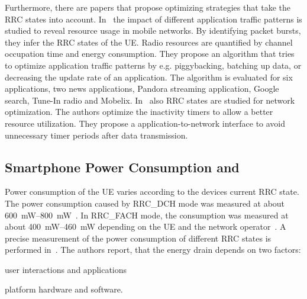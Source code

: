 Furthermore, there are papers that propose optimizing strategies that take the \gls{RRC} states into account. 
In~\cite{Qian2011} the impact of different application traffic patterns is studied to reveal resource usage in mobile networks.
By identifying packet bursts, they infer the \gls{RRC} states of the \gls{UE}.
Radio resources are quantified by channel occupation time and energy consumption.
They propose an algorithm that tries to optimize application traffic patterns by e.g. piggybacking, batching up data, or decreasing the update rate of an application.
The algorithm is evaluated for six applications, two news applications, Pandora streaming application, Google search, Tune-In radio and Mobelix. 
In~\cite{Qian2010b} also \gls{RRC} states are studied for network optimization.
The authors optimize the inactivity timers to allow a better resource utilization. 
They propose a application-to-network interface to avoid unnecessary timer periods after data transmission.

\subsection{Smartphone Power Consumption and }\label{sec:network:background:energy_consumption_qoe}

Power consumption of the \gls{UE} varies according to the devices current \gls{RRC} state.
The power consumption caused by \gls{RRC_DCH} mode was measured at about \SIrange{600}{800}{\milli\watt}~\cite{Qian2011,Qian2010a}.
In \gls{RRC_FACH} mode, the consumption was measured at about \SIrange{400}{460}{\milli\watt} depending on the \gls{UE} and the network operator~\cite{Qian2010a}.
A precise measurement of the power consumption of different \gls{RRC} states is performed in~\cite{Qian2010a,Balasubramanian2009,Lee2004}. 
The authors report, that the energy drain depends on two factors: 
\begin{enumerate*}
\item user interactions and applications 
\item platform hardware and software.
\end{enumerate*}
